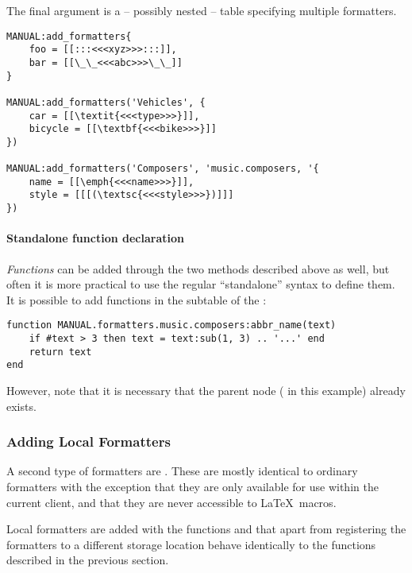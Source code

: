 \documentclass[12pt]{scrartcl}
\begin{document}
The final argument is a -- possibly nested -- table specifying multiple
formatters.

\begin{verbatim}
MANUAL:add_formatters{
	foo = [[:::<<<xyz>>>:::]],
	bar = [[\_\_<<<abc>>>\_\_]]
}

MANUAL:add_formatters('Vehicles', {
	car = [[\textit{<<<type>>>}]],
	bicycle = [[\textbf{<<<bike>>>}]]
})

MANUAL:add_formatters('Composers', 'music.composers, '{
	name = [[\emph{<<<name>>>}]],
	style = [[[(\textsc{<<<style>>>})]]]
})
\end{verbatim}


\paragraph{Standalone function declaration}

\emph{Functions} can be added through the two methods described above as well, but often it is more practical to use the regular “standalone” syntax to define them.  It is possible to add functions in the  subtable of the :

\begin{verbatim}
function MANUAL.formatters.music.composers:abbr_name(text)
	if #text > 3 then text = text:sub(1, 3) .. '...' end
    return text
end
\end{verbatim}

\noindent However, note that it is necessary that the parent node
( in this example) already exists.


\subsubsection{Adding Local Formatters}
\label{sec:usage:adding-local-formatters}

A second type of formatters are .  These
are mostly identical to ordinary formatters with the exception that they are
only available for use within the current client, and that they are never
accessible to \LaTeX\ macros.

Local formatters are added with the functions
 and 
that apart from registering the formatters to a different storage location
behave identically to the functions described in the previous section.
\end{document}
